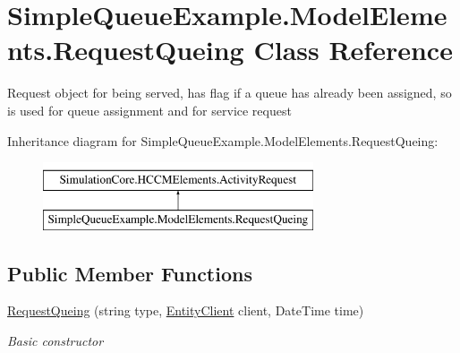 \hypertarget{class_simple_queue_example_1_1_model_elements_1_1_request_queing}{}\section{Simple\+Queue\+Example.\+Model\+Elements.\+Request\+Queing Class Reference}
\label{class_simple_queue_example_1_1_model_elements_1_1_request_queing}


Request object for being served, has flag if a queue has already been assigned, so is used for queue assignment and for service request  


Inheritance diagram for Simple\+Queue\+Example.\+Model\+Elements.\+Request\+Queing\+:\begin{figure}[H]
\begin{center}
\leavevmode
\includegraphics[height=2.000000cm]{class_simple_queue_example_1_1_model_elements_1_1_request_queing}
\end{center}
\end{figure}
\subsection*{Public Member Functions}
\begin{DoxyCompactItemize}
\item 
\hyperlink{class_simple_queue_example_1_1_model_elements_1_1_request_queing_ad4d77fd57c5bc6c2b43193b7e4fe805b}{Request\+Queing} (string type, \hyperlink{class_simple_queue_example_1_1_model_elements_1_1_entity_client}{Entity\+Client} client, Date\+Time time)
\begin{DoxyCompactList}\small\item\em Basic constructor \end{DoxyCompactList}\end{DoxyCompactItemize}
